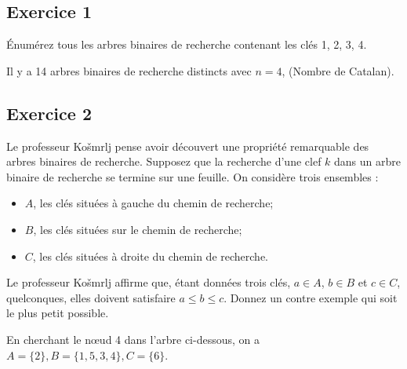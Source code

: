 \documentclass[iutinfo,a4paper,10pt]{ustl-tdtp}
\date{\annee{2018}--\annee{2019}}
\begin{document}
\maketitle
\thispagestyle{empty}

\subsection*{Exercice 1}
Énumérez tous les arbres binaires de recherche contenant les clés 1, 2, 3, 4.\\
\begin{solution}
{\color{red}
Il y a 14 arbres binaires de recherche distincts avec $n=4$, (Nombre de Catalan).
}
\end{solution}

\subsection*{Exercice 2}

Le professeur Ko\v smrlj pense avoir découvert une propriété remarquable des
arbres binaires de recherche. Supposez que la recherche d'une clef $k$ dans un
arbre binaire de recherche se termine sur une feuille. On considère trois
ensembles :
\begin{itemize}
\item $A$, les clés situées à gauche du chemin de recherche;
\item $B$, les clés situées sur le chemin de recherche;
\item $C$, les clés situées à droite du chemin de recherche.
\end{itemize}

Le professeur Ko\v smrlj affirme que, étant données trois clés, $a\in A$,
$b\in B$ et $c\in C$, quelconques, elles doivent satisfaire $a \leq b \leq c$.
Donnez un contre exemple qui soit le plus petit possible.

\begin{solution}
{\color{red}
En cherchant le n\oe ud 4 dans l'arbre ci-dessous, on a $A = \{2\}, B = \{1, 5 ,3, 4\}, C = \{6\}$.\\
}
\end{solution}
\end{document}
